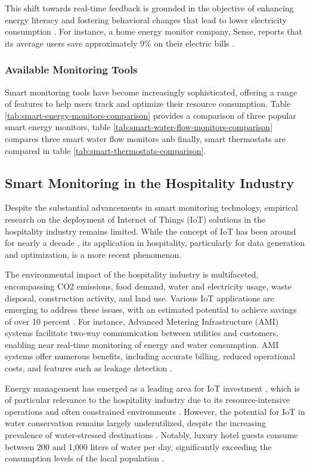 This shift towards real-time feedback is grounded in the objective of enhancing energy literacy and fostering behavioral 
changes that lead to lower electricity consumption \cite{Webb2014}. For instance, a home energy monitor company, Sense, 
reports that its average users save approximately 9\% on their electric bills \cite{Walker2023}.

\subsubsection{Available Monitoring Tools}
Smart monitoring tools have become increasingly sophisticated, offering a range of features to help users track and 
optimize their resource consumption. Table \ref{tab:smart-energy-monitors-comparison} provides a comparison of three
popular smart energy monitors, table \ref{tab:smart-water-flow-monitors-comparison} compares three smart water flow 
monitors anb finally, smart thermostats are compared in table \ref{tab:smart-thermostats-comparison}.

\subsection{Smart Monitoring in the Hospitality Industry}

Despite the substantial advancements in smart monitoring technology, empirical research on the deployment of Internet of 
Things (IoT) solutions in the hospitality industry remains limited. While the concept of IoT has been around for nearly 
a decade \cite{Atzori2010}, its application in hospitality, particularly for data generation and optimization, is a more 
recent phenomenon.

The environmental impact of the hospitality industry is multifaceted, encompassing CO2 emissions, food demand, water and 
electricity usage, waste disposal, construction activity, and land use. Various IoT applications are emerging to address 
these issues, with an estimated potential to achieve savings of over 10 percent \cite{Kratzert2020}. For instance, 
Advanced Metering Infrastructure (AMI) systems facilitate two-way communication between utilities and customers, 
enabling near real-time monitoring of energy and water consumption. AMI systems offer numerous benefits, including 
accurate billing, reduced operational costs, and features such as leakage detection \cite{Monks2019}.

Energy management has emerged as a leading area for IoT investment \cite{Naimat2017}, which is of particular relevance 
to the hospitality industry due to its resource-intensive operations and often constrained environments 
\cite{Styles2014}. However, the potential for IoT in water conservation remains largely underutilized, despite the 
increasing prevalence of water-stressed destinations \cite{Tortella2011}. Notably, luxury hotel guests consume between 
200 and 1,000 liters of water per day, significantly exceeding the consumption levels of the local population 
\cite{Becken2014}.


